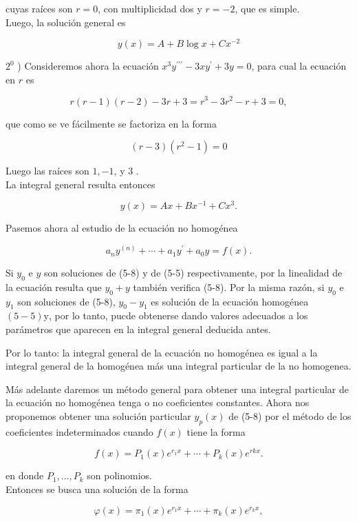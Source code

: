 \documentclass[10pt]{article}
\theoremstyle{plain}
\theoremstyle{definition}
\theoremstyle{remark}
\begin{document}
cuyas raíces son $r=0$, con multiplicidad dos y $r=-2$, que es simple.\\
Luego, la solución general es

$$
y(x)=A+B \log x+C x^{-2}
$$

$2^{0}$ ) Consideremos ahora la ecuación $x^{3} y^{\prime \prime \prime}-3 x y^{\prime}+3 y=0$, para cual la ecuación en $r$ es

$$
r(r-1)(r-2)-3 r+3=r^{3}-3 r^{2}-r+3=0,
$$

que como se ve fácilmente se factoriza en la forma

$$
(r-3)\left(r^{2}-1\right)=0
$$

Luego las raíces son $1,-1$, y 3 .\\
La integral general resulta entonces

$$
y(x)=A x+B x^{-1}+C x^{3} .
$$

Pasemos ahora al estudio de la ecuación no homogénea


\begin{equation*}
a_{n} y^{(n)}+\cdots+a_{1} y^{\prime}+a_{0} y=f(x) . \tag{5.8}
\end{equation*}


Si $y_{0}$ e $y$ son soluciones de (5-8) y de (5-5) respectivamente, por la linealidad de la ecuación resulta que $y_{0}+y$ también verifica (5-8). Por la misma razón, si $y_{0}$ e $y_{1}$ son soluciones de (5-8), $y_{0}-y_{1}$ es solución de la ecuación homogénea $(5-5) \mathrm{y}$, por lo tanto, pucde obtenerse dando valores adecuados a los parámetros que aparecen en la integral general deducida antes.

Por lo tanto: la integral general de la ecuación no homogénea es igual a la integral general de la homogénea más una integral particular de la no homogenea.

Más adelante daremos un método general para obtener una integral particular de la ecuación no homogénea tenga o no coeficientes constantes. Ahora nos proponemos obtener una solución particular $y_{p}(x)$ de (5-8) por el método de los coeficientes indeterminados cuando $f(x)$ tiene la forma


\begin{equation*}
f(x)=P_{1}(x) e^{r_{1} x}+\cdots+P_{k}(x) e^{r k x} . \tag{5-9}
\end{equation*}


en donde $P_{1}, \ldots, P_{k}$ son polinomios.\\
Entonces se busca una solución de la forma


\begin{equation*}
\varphi(x)=\pi_{1}(x) e^{r_{1} x}+\cdots+\pi_{k}(x) e^{r_{k} x}, \tag{5-10}
\end{equation*}
\end{document}
